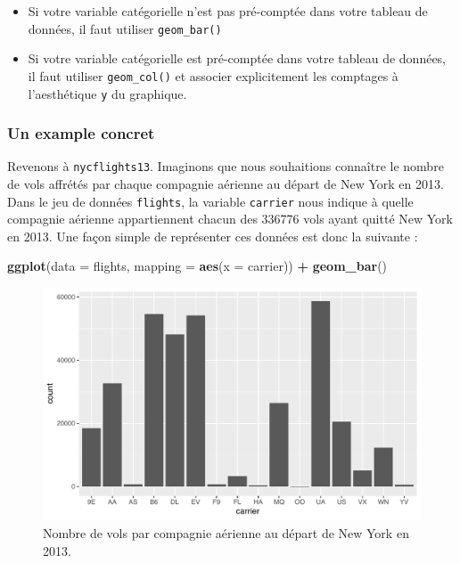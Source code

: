 \documentclass[a4paperpaper,]{article}
\newenvironment{Shaded}{\begin{snugshade}}{\end{snugshade}}
\newcommand{\KeywordTok}[1]{\textcolor[rgb]{0.13,0.29,0.53}{\textbf{#1}}}
\newcommand{\DataTypeTok}[1]{\textcolor[rgb]{0.13,0.29,0.53}{#1}}
\newcommand{\StringTok}[1]{\textcolor[rgb]{0.31,0.60,0.02}{#1}}
\newcommand{\OperatorTok}[1]{\textcolor[rgb]{0.81,0.36,0.00}{\textbf{#1}}}
\newcommand{\NormalTok}[1]{#1}
\providecommand{\tightlist}{%
  \setlength{\itemsep}{0pt}\setlength{\parskip}{0pt}}
\theoremstyle{definition}
\theoremstyle{definition}
\theoremstyle{definition}
\theoremstyle{remark}
\begin{document}
\begin{itemize}
\tightlist
\item
  Si votre variable catégorielle n'est pas pré-comptée dans votre
  tableau de données, il faut utiliser \texttt{geom\_bar()}
\item
  Si votre variable catégorielle est pré-comptée dans votre tableau de
  données, il faut utiliser \texttt{geom\_col()} et associer
  explicitement les comptages à l'aesthétique \texttt{y} du graphique.
\end{itemize}

\subsubsection{Un example concret}\label{un-example-concret}

Revenons à \texttt{nycflights13}. Imaginons que nous souhaitions
connaître le nombre de vols affrétés par chaque compagnie aérienne au
départ de New York en 2013. Dans le jeu de données \texttt{flights}, la
variable \texttt{carrier} nous indique à quelle compagnie aérienne
appartiennent chacun des 336776 vols ayant quitté New York en 2013. Une
façon simple de représenter ces données est donc la suivante :

\begin{Shaded}
\begin{Highlighting}[]
\KeywordTok{ggplot}\NormalTok{(}\DataTypeTok{data =}\NormalTok{ flights, }\DataTypeTok{mapping =} \KeywordTok{aes}\NormalTok{(}\DataTypeTok{x =}\NormalTok{ carrier)) }\OperatorTok{+}
\StringTok{  }\KeywordTok{geom_bar}\NormalTok{()}
\end{Highlighting}
\end{Shaded}

\begin{figure}[htpb]

{\centering \includegraphics[width=0.9\linewidth]{figure/bpcarrier-1} 

}

\caption{Nombre de vols par compagnie aérienne au départ de New York en 2013.}\label{fig:bpcarrier}
\end{figure}
\end{document}
